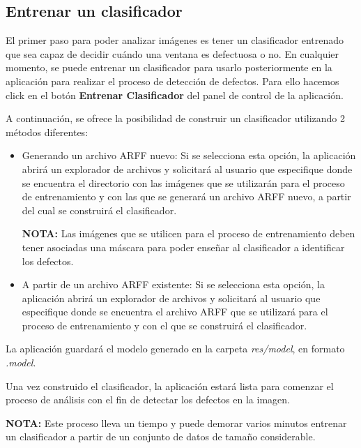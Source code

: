 \subsection{Entrenar un clasificador}
El primer paso para poder analizar imágenes es tener un clasificador entrenado que sea capaz de decidir cuándo una ventana es defectuosa o no. En cualquier momento, se puede entrenar un clasificador para usarlo posteriormente en la aplicación para realizar el proceso de detección de defectos. Para ello hacemos click en el botón \textbf{Entrenar Clasificador} del panel de control de la aplicación.


A continuación, se ofrece la posibilidad de construir un clasificador utilizando 2 métodos diferentes:


\begin{itemize}
\item Generando un archivo ARFF nuevo: Si se selecciona esta opción, la aplicación abrirá un explorador de archivos y solicitará al usuario que especifique donde se encuentra el directorio con las imágenes que se utilizarán para el proceso de entrenamiento y con las que se generará un archivo ARFF nuevo, a partir del cual se construirá el clasificador.

\textbf{NOTA:} Las imágenes que se utilicen para el proceso de entrenamiento deben tener asociadas una máscara para poder enseñar al clasificador a identificar los defectos.

\item A partir de un archivo ARFF existente: Si se selecciona esta opción, la aplicación abrirá un explorador de archivos y solicitará al usuario que especifique donde se encuentra el archivo ARFF que se utilizará para el proceso de entrenamiento y con el que se construirá el clasificador.
\end{itemize}

La aplicación guardará el modelo generado en la carpeta \textit{res/model}, en formato \textit{.model}.

Una vez construido el clasificador, la aplicación estará lista para comenzar el proceso de análisis con el fin de detectar los defectos en la imagen.

\textbf{NOTA:} Este proceso lleva un tiempo y puede demorar varios minutos entrenar un clasificador a partir de un conjunto de datos de tamaño considerable.

